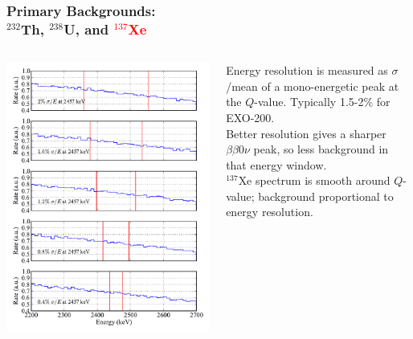\documentclass{beamer}
\begin{document}
\begin{frame}
\begin{center}
\frametitle{\hfill Primary Backgrounds:\\\hfill $^{232}$Th, $^{238}$U, and \textcolor{red}{$^{137}$Xe}}
\end{center}
\begin{columns}
\begin{column}{.6\textwidth}
\includegraphics[keepaspectratio=true,width=\textwidth]{Xe_Spectra_vs_Res.pdf}
\end{column}
\begin{column}{.4\textwidth}
\vspace{.5cm}

Energy resolution is measured as $\sigma$/mean of a mono-energetic peak at the $Q$-value.  Typically 1.5-2\% for EXO-200.\\[\baselineskip]

Better resolution gives a sharper $\beta\beta 0\nu$ peak, so less background in that energy window.\\[\baselineskip]

$^{137}$Xe spectrum is smooth around $Q$-value; background proportional to energy resolution.
\end{column}
\end{columns}
\end{frame}
\end{document}
